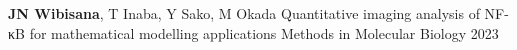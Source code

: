 
\begin{cventries}

  \cventrypublast
    {\textbf{JN Wibisana}, T Inaba, Y Sako, M Okada} %
    {Quantitative imaging analysis of NF-κB for mathematical modelling applications} %
    {Methods in Molecular Biology} %
    {2023} %


\end{cventries}